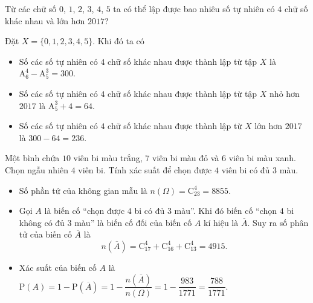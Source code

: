 \begin{bt}%
	Từ các chữ số $0$, $1$, $2$, $3$, $4$, $5$ ta có thể lập được bao nhiêu số tự nhiên có $4$ chữ số khác nhau và lớn hơn $2017$?
	\loigiai
	{
	Đặt $X=\{0,1,2,3,4,5\}$. Khi đó ta có
	\begin{itemize}
		\item Số các số tự nhiên có $4$ chữ số khác nhau được thành lập từ tập $X$ là $\mathrm{A}^4_6-\mathrm{A}^3_5=300$.
		\item Số các số tự nhiên có $4$ chữ số khác nhau được thành lập từ tập $X$ nhỏ hơn $2017$ là $\mathrm{A}^3_5+4=64$.
		\item Số các số tự nhiên có $4$ chữ số khác nhau được thành lập từ $X$ lớn hơn $2017$ là $300-64=236$.
	\end{itemize}
	}

\end{bt}

\begin{bt}%
	Một bình chứa $10$ viên bi màu trắng, $7$ viên bi màu đỏ và $6$ viên bi màu xanh. Chọn ngẫu nhiên $4$ viên bi. Tính xác suất để chọn được $4$ viên bi có đủ $3$ màu.
	\loigiai
	{
	\begin{itemize}
		\item Số phần tử của không gian mẫu là $n(\Omega)=\mathrm{C}^4_{23}=8855.$
		\item Gọi $A$ là biến cố ``chọn được $4$ bi có đủ $3$ màu''. Khi đó biến cố ``chọn $4$ bi không có đủ $3$ màu'' là biến cố đối của biến cố $A$ kí hiệu là $\overline{A}$. Suy ra số phân tử của biến cố $\overline{A}$ là
		$$n(\overline{A})=\mathrm{C}^4_{17}+\mathrm{C}^4_{16}+\mathrm{C}^4_{13}=4915.$$
		\item Xác suất của biến cố $A$ là $\mathrm{P}(A)=1-\mathrm{P}(\overline{A})=1-\dfrac{n(\overline{A})}{n(\Omega)}=1-\dfrac{983}{1771}=\dfrac{788}{1771}$.
	\end{itemize}	
	}
	
\end{bt}

